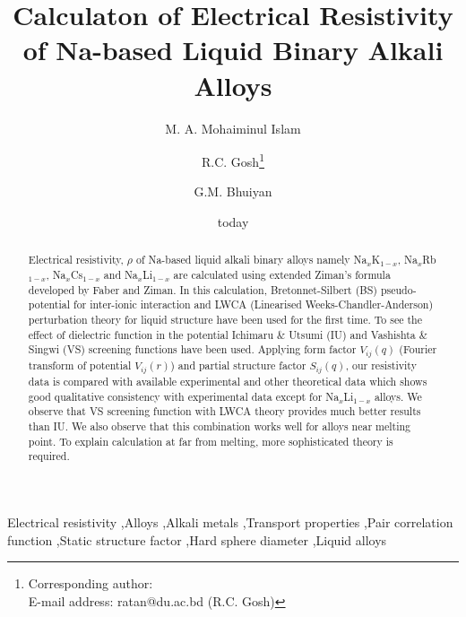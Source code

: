 \documentclass[final12pt]{elsarticle}
\begin{document}
\begin{frontmatter}

\title{Calculaton of Electrical Resistivity of Na-based Liquid Binary Alkali Alloys}

\author{M. A. Mohaiminul Islam}

\author{R.C. Gosh\footnote{Corresponding author: \\E-mail address: ratan@du.ac.bd (R.C. Gosh)}}

\address{Department of Physics, University of Dhaka, Dhaka-1000, Bangladesh}

\author{G.M. Bhuiyan}
\address{Department of Theoretical Physics, University of Dhaka, Dhaka-1000, Bangladesh}

\date{today}




\begin{abstract}
Electrical resistivity, $\rho$ of Na-based liquid alkali binary alloys namely Na$_x$K$_{1-x}$, Na$_x$Rb$_{1-x}$, Na$_x$Cs$_{1-x}$ and Na$_x$Li$_{1-x}$ are calculated using extended Ziman's formula developed by Faber and Ziman. In this calculation, Bretonnet-Silbert (BS) pseudo-potential for inter-ionic interaction and LWCA (Linearised Weeks-Chandler-Anderson) perturbation theory for liquid structure have been used for the first time. To see the effect of dielectric function in the potential Ichimaru \& Utsumi (IU) and Vashishta \& Singwi (VS) screening functions have been used. Applying form factor $V_{ij}(q)$ (Fourier transform of potential $V_{ij}(r)$) and partial structure factor $S_{ij}(q)$, our resistivity data is compared with available experimental and other theoretical data which shows good qualitative consistency with experimental data except for Na$_x$Li$_{1-x}$ alloys. We observe that VS screening function with LWCA theory provides much better results than IU. We also observe that this combination works well for alloys near melting point. To explain calculation at far from melting, more sophisticated theory is required.

\end{abstract}

\begin{keyword}
Electrical resistivity \sep Alloys \sep Alkali metals \sep Transport properties \sep Pair correlation function \sep Static structure factor \sep Hard sphere diameter \sep Liquid alloys
\end{keyword}

\end{frontmatter}
\end{document}

